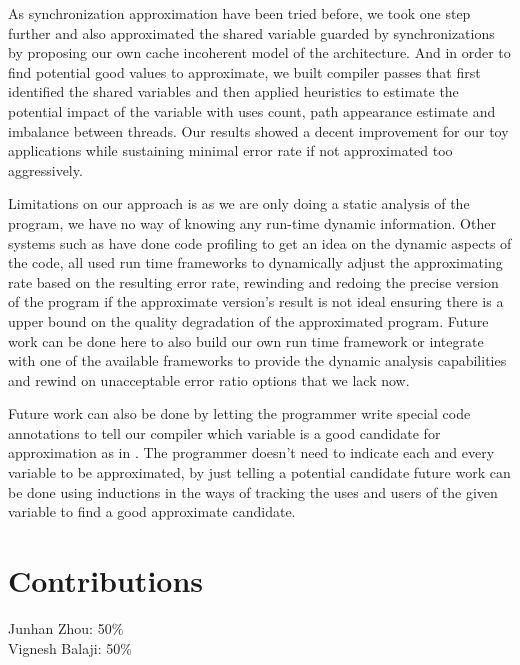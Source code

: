 \documentclass[12pt,conference]{IEEEtran}
\begin{document}
As synchronization approximation have been tried before, we took one step further
and also approximated the shared variable guarded by synchronizations by proposing
our own cache incoherent model of the architecture. And in order to find potential
good values to approximate, we built compiler passes that first identified the 
shared variables and then applied heuristics to estimate the potential impact of 
the variable with uses count, path appearance estimate and imbalance between threads.
Our results showed a decent improvement for our toy applications while sustaining 
minimal error rate if not approximated too aggressively.

Limitations on our approach is as we are only doing a static analysis of the program,
we have no way of knowing any run-time dynamic information. Other systems such as 
\cite{green}\cite{chisel} have done code profiling to get an idea on the dynamic 
aspects of the code, \cite{ibm}\cite{helixup}\cite{paraprox}\cite{green} all used 
run time frameworks to dynamically adjust the approximating rate based on the 
resulting error rate, rewinding and redoing the precise version of the program 
if the approximate version's result is not ideal ensuring there is a upper
bound on the quality degradation of the approximated program. Future work can be 
done here to also build our own run time framework or integrate with one of the 
available frameworks to provide the dynamic analysis capabilities and rewind on 
unacceptable error ratio options that we lack now.

Future work can also be done by letting the programmer write special code annotations
to tell our compiler which variable is a good candidate for approximation as in
\cite{enerJ}\cite{accept}\cite{chisel}. The programmer doesn't need to indicate 
each and every variable to be approximated, by just telling a potential candidate 
future work can be done using inductions in the ways of \cite{chisel}\cite{stochastic}
tracking the uses and users of the given variable to find a good approximate 
candidate.

\section{Contributions}

Junhan Zhou: 50\%\\
Vignesh Balaji: 50\%
\end{document}
